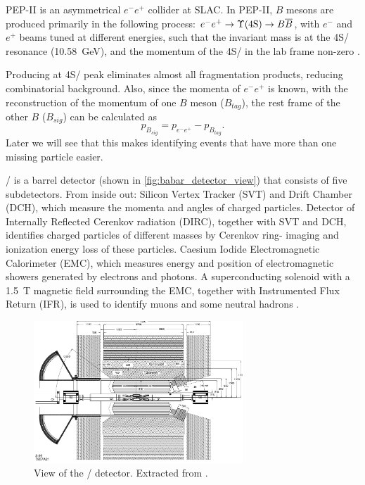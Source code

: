 PEP-II is an asymmetrical $e^- e^+$ collider at SLAC.
In PEP-II, $B$ mesons are produced primarily in the following process:
$e^- e^+ \rightarrow \Y4S/ \rightarrow B \overline{B}$, with
$e^-$ and $e^+$ beams tuned at different energies,
such that the invariant mass is at the \Y4S/ resonance (10.58~GeV),
and the momentum of the \Y4S/ in the lab frame
non-zero \cite{Harrison:1998yr}.

Producing at \Y4S/ peak eliminates almost all fragmentation products, reducing
combinatorial background.
Also, since the momenta of $e^- e^+$ is known, with the reconstruction of the
momentum of one $B$ meson ($B_{tag}$), the rest frame of the other $B$
($B_{sig}$) can be calculated as
\begin{equation}
    p_{B_{sig}} = p_{e^-e^+} - p_{B_{tag}}.
\end{equation}
Later we will see that this makes identifying events that have more than one
missing particle easier.

\BaBar/ is a barrel detector (shown in \autoref{fig:babar_detector_view})
that consists of five subdetectors. From inside out:
Silicon Vertex Tracker (SVT) and Drift Chamber (DCH), which measure the momenta
and angles of charged particles.
Detector of Internally Reflected Cerenkov radiation (DIRC), together with SVT
and DCH, identifies charged particles of different masses by Cerenkov ring-
imaging and ionization energy loss of these particles.
Caesium Iodide Electromagnetic Calorimeter (EMC), which measures energy and
position of electromagnetic showers generated by electrons and photons.
A superconducting solenoid with a \SI{1.5}{T} magnetic field surrounding the
EMC, together with Instrumented Flux Return (IFR), is used to identify muons and
some neutral hadrons \cite{Lees:2013uzd}.

\begin{figure}[ht]
    \centering
    \includegraphics[width=0.7\textwidth]{figs/babar_detector_view.pdf}
    \caption{
        View of the \BaBar/ detector.
        Extracted from \cite{Boutigny:1995ib}.
    }
    \label{fig:babar_detector_view}
\end{figure}

